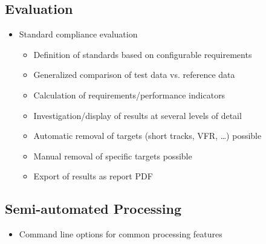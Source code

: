 \subsection{Evaluation}    
\begin{itemize}  
    \item Standard compliance evaluation
    \begin{itemize}  
        \item Definition of standards based on configurable requirements
        \item Generalized comparison of test data vs. reference data
        \item Calculation of requirements/performance indicators
        \item Investigation/display of results at several levels of detail
        \item Automatic removal of targets (short tracks, VFR, …) possible
        \item Manual removal of specific targets possible
        \item Export of results as report PDF
    \end{itemize}
\end{itemize}

\subsection{Semi-automated Processing}    
\begin{itemize}  
    \item Command line options for common processing features
\end{itemize}

